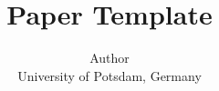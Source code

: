\documentclass[a4paper]{article}
\begin{document}
\title{Paper Template}

\author{%
  Author\\
  University of Potsdam, Germany
}

\maketitle







\printbibliography{}
\end{document}
